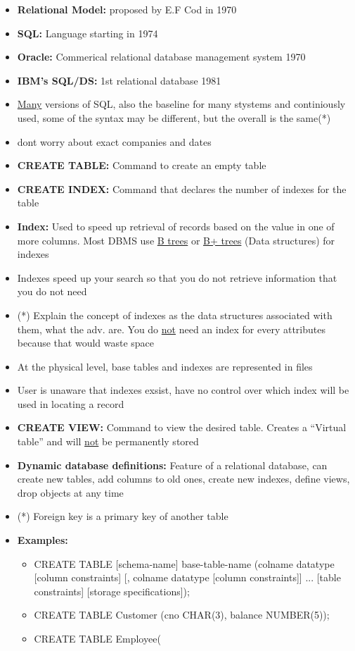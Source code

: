 \documentclass[12pt]{article}
\begin{document}
\begin{itemize}
		\item \textbf{Relational Model:} proposed by E.F Cod in 1970
		\item \textbf{SQL:} Language starting in 1974
		\item \textbf{Oracle:} Commerical relational database management system 1970
		\item \textbf{IBM's SQL/DS:} 1st relational database 1981
		\item \underline{Many} versions of SQL, also the baseline for many stystems and continiously used, some
			of the syntax may be different, but the overall is the same(*)
		\item dont worry about exact companies and dates
		\item \textbf{CREATE TABLE:} Command to create an empty table
		\item \textbf{CREATE INDEX:} Command that declares the number of indexes for the table
		\item \textbf{Index:} Used to speed up retrieval of records based on the value in one of more columns.
			Most DBMS use \underline{B trees} or \underline{B+ trees} (Data structures) for indexes
		\item Indexes speed up your search so that you do not retrieve information that you do not need
		\item (*) Explain the concept of indexes as the data structures associated with them, what the adv. are.
			You do \underline{not} need an index for every attributes because that would waste space
		\item At the physical level, base tables and indexes are represented in files
		\item User is unaware that indexes exsist, have no control over which index will be used in locating a
			record
		\item \textbf{CREATE VIEW:} Command to view the desired table. Creates a ``Virtual table'' and will 
			\underline{not} be permanently stored
		\item \textbf{Dynamic database definitions:} Feature of a relational database, can create new tables, 
			add columns to old ones, create new indexes, define views, drop objects at any time
		\item (*) Foreign key is a primary key of another table
		\item \textbf{Examples:}
			\begin{itemize}
				\item CREATE TABLE [schema-name] base-table-name (colname datatype [column constraints]
						[, colname datatype [column constraints]] ... [table constraints] [storage specifications]);
				\item CREATE TABLE Customer (cno CHAR(3), balance NUMBER(5));
				\item CREATE TABLE Employee(


\end{itemize}
\end{itemize}
\end{document}
